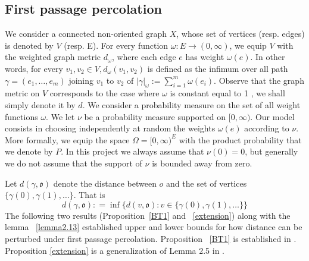 \documentclass[12 pt]{amsart}
\newcommand{\gothic}{\mathfrak}
\newcommand{\go}{{\gothic o}}
\newtheorem{theorem}{Theorem}[section]
\theoremstyle{definition}
\theoremstyle{remark}
\newcommand{\pka}{\partial_{\kappa}}
\begin{document}

\subsection{First passage percolation} \label{fpp}
 We consider a connected non-oriented graph $X$, whose set of vertices (resp. edges) is denoted by $V$ (resp. E). For every function $\omega: E \rightarrow(0, \infty)$, we equip $V$ with the weighted graph metric $d_{\omega}$, where each edge $e$ has weight $\omega(e)$. In other words, for every $v_{1}, v_{2} \in V, d_{\omega}\left(v_{1}, v_{2}\right)$ is defined as the infimum over all path $\gamma=\left(e_{1}, \ldots, e_{m}\right)$ joining $v_{1}$ to $v_{2}$ of $|\gamma|_{\omega}:=\sum_{i=1}^{m} \omega\left(e_{i}\right)$. Observe that the graph metric on $V$ corresponds to the case where $\omega$ is constant equal to 1 , we shall simply denote it by $d$. We consider a probability measure on the set of all weight functions $\omega$. We let $\nu$ be a probability measure supported on $[0, \infty)$. Our model consists in choosing independently at random the weights $\omega(e)$ according to $\nu$. More formally, we equip the space $\Omega=[0, \infty)^{E}$ with the product probability that we denote by $P$. In this project we always assume that $\nu({0})=0$, but generally we do not assume that the support of $\nu$ is bounded away from zero.

 Let $d(\gamma, \go)$ denote the distance between $o$ and the set of vertices $\{\gamma(0), \gamma(1), \ldots\}$. That is 
 \[d(\gamma, \go) : = \inf\bigg\{d(v, \go) : v \in \{\gamma(0), \gamma(1), \ldots\}  \bigg\} \]
The following two results (Proposition~\ref{BT1} and ~\ref{extension}) along with the lemma ~\ref{lemma2.13} established upper and lower bounds for how distance can be perturbed under first passage percolation. Proposition ~\ref{BT1} is established in \cite{BT17}. Proposition \ref{extension} is a generalization of  Lemma 2.5 in \cite{BT17}. 
\end{document}
